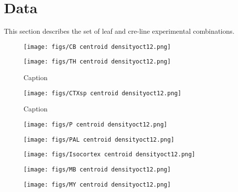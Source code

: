 
\section{Data}
\label{supp_sec:data}

This section describes the set of leaf and cre-line experimental combinations.

\newpage

\begin{figure}[H]
    \centering
    \texttt{[image: figs/CB centroid densityoct12.png]}
    \label{fig:my_label}
\end{figure}
\newpage

\begin{figure}[H]
    \centering
    \texttt{[image: figs/TH centroid densityoct12.png]}
    \caption{Caption}
    \label{fig:my_label}
\end{figure}
\newpage

\begin{figure}[H]
    \centering
    \texttt{[image: figs/CTXsp centroid densityoct12.png]}
    \caption{Caption}
    \label{fig:my_label}
\end{figure}
\newpage

\begin{figure}[H]
    \centering
    \texttt{[image: figs/P centroid densityoct12.png]}
    \label{fig:my_label}
\end{figure}
\newpage

\begin{figure}[H]
    \centering
    \texttt{[image: figs/PAL centroid densityoct12.png]} 
    \label{fig:my_label}
\end{figure}
\newpage

\begin{figure}[H]
    \centering
    \texttt{[image: figs/Isocortex centroid densityoct12.png]}
    \label{fig:my_label}
\end{figure}
\newpage

\begin{figure}[H]
    \centering
    \texttt{[image: figs/MB centroid densityoct12.png]} 
    \label{fig:my_label}
\end{figure}
\newpage

\begin{figure}[H]
    \centering
    \texttt{[image: figs/MY centroid densityoct12.png]} 
    \label{fig:my_label}
\end{figure}
\newpage

